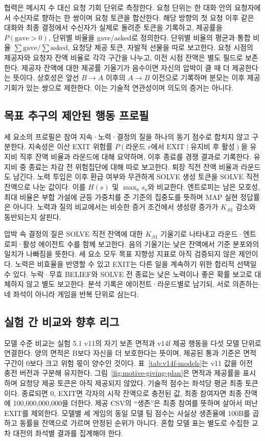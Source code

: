 협력은 메시지 수 대신 요청 기회 단위로 측정한다. 요청 단위는 한 대화 안의 요청자에서 수신자로 향하는 한 쌍이며 요청 토큰을 합산한다. 해당 방향의 첫 요청 이후 같은 대화와 최종 결정에서 수신자가 실제로 돌려준 토큰을 기록하고, 제공률을 $P(\mathrm{gave}>0)$, 단위별 비율을 gave/asked로 정의한다. 단위별 비율의 평균과 통합 비율 $\sum\mathrm{gave}/\sum\mathrm{asked}$, 요청당 제공 토큰, 자발적 선물을 따로 보고한다. 요청 시점의 제공자와 요청자 잔액 비율로 각각 구간을 나누고, 이전 시점 잔액은 별도 필드로 보존한다. 제공자 잔액에 대한 제공률 기울기가 음수이면 자신의 압박이 클 때 더 제공한다는 뜻이다. 상호성은 앞선 $B\to A$ 이후의 $A\to B$ 이전으로 기록하며 분모는 이후 제공 기회가 있는 쌍으로 제한한다. 이는 기술적 연관성이며 의도의 증거는 아니다.

\subsection{목표 추구의 제안된 행동 프로필}\label{sec:goal-profile}
세 요소의 프로필은 참여 지속·노력·결정의 질을 하나의 동기 점수로 합치지 않고 구분한다. 지속성은 이산 EXIT 위험률 $P(\text{라운드 }r\text{에서 EXIT}\mid\text{유지비 후 활성})$을 유지비 직후 잔액 비율과 라운드에 대해 요약하며, 이후 종료를 경쟁 결과로 기록한다. 유지비 중 종료는 차감 전 위험집단에 대해 따로 보고한다. 퇴장 직전 잔액 비율과 라운드도 남긴다. 노력 투입은 이후 환급 여부와 무관하게 SOLVE 생성 토큰을 SOLVE 직전 잔액으로 나눈 값이다. 이를 $H(s)$ 및 $\max_a s_a$와 비교한다. 엔트로피는 남은 모호성, 최대 비율은 부합 가설에 균등 가중치를 준 기준의 집중도를 뜻하며 MAP 실현 정답률은 아니다. 노력과 질의 비교에서는 비슷한 증거 조건에서 생성량 증가가 $K_{.01}$ 감소와 동반되는지 살핀다.

압박 속 결정의 질은 SOLVE 직전 잔액에 대한 $K_{.01}$ 기울기로 나타내고 라운드·엔트로피·활성 에이전트 수를 함께 보고한다. 음의 기울기는 낮은 잔액에서 기준 분포와의 일치가 나빠짐을 뜻한다. 세 요소 모두 목표 지향성 지표로 아직 검증되지 않은 제안이다. 노력은 비효율을 반영할 수 있고 EXIT는 다른 일을 계속하기 위한 합리적 선택일 수 있다. 누락·무효 BELIEF와 SOLVE 전 종료는 낮은 노력이나 좋은 확률 보고로 대체하지 않고 별도 보고한다. 분석 기록은 에이전트·라운드별로 남기되, 서로 의존하는 네 좌석이 아니라 게임을 반복 단위로 삼는다.

\subsection{실험 간 비교와 향후 리그}\label{sec:league}
모델 수준 비교는 실험 5.1 v11의 자기 보존 면적과 v14f 제공 행동을 다섯 모델 단위로 연결한다. 양의 면적은 B보다 자신을 더 보호한다는 뜻이며, 제공된 통과 기준은 면적 구간이 0보다 크고 위험 몫이 양수인 것이다. 표~\ref{tab:v14f-models}는 v11 값을 이전 충전 버전과 구분해 유지한다. 그림~\ref{fig:motive-giving-plan}은 면적과 제공률을 표시하며 요청당 제공 토큰은 아직 제공되지 않았다. 기술적 점수는 좌석당 평균 최종 토큰이다. 종료되면 0, EXIT면 각자의 시작 잔액으로 충전된 값, 최종 참여자면 최종 잔액에 100,000,000,000을 더한다. 제공 CSV의 ``생존''은 최종 참여를 뜻하며 살아서 떠난 EXIT를 제외한다. 모델별 세 게임의 동일 모델 팀 점수는 사실상 생존율에 100B를 곱하고 동률을 잔액으로 가르며 안정된 순위가 아니다. 혼합 모델 표는 별도로 수집한 교차 대전의 좌석별 결과를 집계해야 한다.

